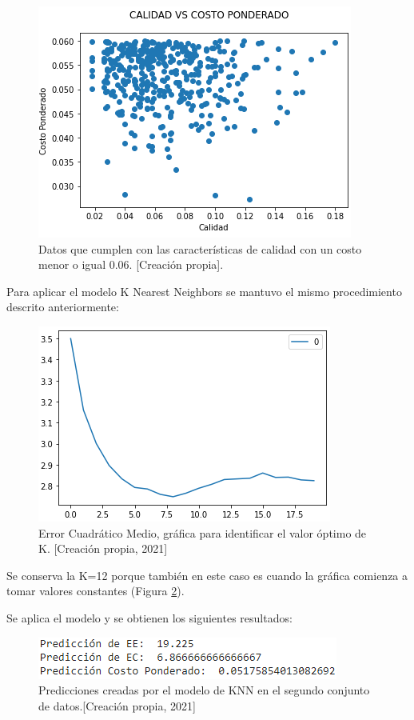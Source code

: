 \documentclass{article}
\begin{document}
\begin{figure}[!h]
    \centering
    \includegraphics[scale=.7]{F4/F4-im12.PNG}
    \caption{Datos que cumplen con las características de calidad con un costo menor o igual 0.06. [Creación propia]. }
    \label{fig:costo_calidad_acotada2}
\end{figure}\pagebreak

Para aplicar el modelo K Nearest Neighbors se mantuvo el mismo procedimiento descrito anteriormente:

\begin{figure}[!h]
    \centering
    \includegraphics[scale=.7]{F4/F4-im13.PNG}
    \caption{Error Cuadrático Medio, gráfica para identificar el valor óptimo de K. [Creación propia, 2021]}
    \label{fig:Codo2}
\end{figure}

Se conserva la K=12 porque también en este caso es cuando la gráfica comienza a tomar valores constantes (Figura \ref{fig:Codo2}). 

Se aplica el modelo y se obtienen los siguientes resultados:
\begin{figure}[!h]
    \centering
    \includegraphics[scale=.7]{F4/F4-im14.PNG}
    \caption{Predicciones creadas por el modelo de KNN en el segundo conjunto de datos.[Creación propia, 2021]}
    \label{fig:Prediccion2.2}
\end{figure}
\end{document}
